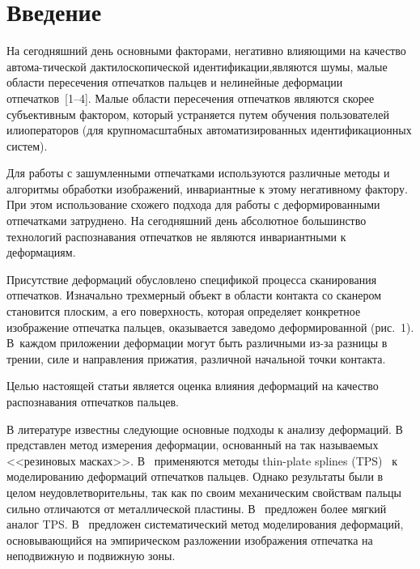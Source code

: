       \begin{multicols}{2}

      \label{st\stat}

     \section*{Введение}
      
      На сегодняшний день основными факторами, негативно влияющими на качество 
автома-\linebreak тической дактилоскопической идентификации,\linebreak являются шумы, малые области 
пересечения отпечатков пальцев и нелинейные деформации отпечатков~[1--4].  Малые 
области пересечения отпечатков являются скорее субъективным фактором, который 
устраняется путем обучения пользователей или\linebreak операторов (для крупномасштабных 
автоматизированных идентификационных систем).
      
      Для работы с зашумленными отпечатками используются различные методы и 
алгоритмы обработки изображений, инвариантные к этому негативному фактору. При 
этом использование схожего подхода для работы с деформированными отпечатками 
затруднено. На сегодняшний день абсолютное большинство технологий распознавания 
отпечатков не являются инвариантными к деформациям.
      
      Присутствие деформаций обусловлено спецификой процесса сканирования отпечатков. 
Изначально трехмерный объект в области контакта со сканером становится плоским, а его 
поверхность, которая определяет конкретное изображение отпечатка пальцев, оказывается 
заведомо деформированной (рис.~1). В~каж\-дом приложении деформации могут 
быть различными из-за разницы в трении, силе и направления прижатия, различной 
начальной точки контакта.

      Целью настоящей статьи является оценка влияния деформаций на качество 
распознавания отпечатков пальцев. 
     
      В литературе известны следующие основные подходы к анализу деформаций. 
В~\cite{5ushm} пред\-став\-лен метод измерения деформации, основанный на так 
называемых <<резиновых масках>>. В~\cite{6ushm} применяются методы thin-plate splines 
(TPS)~\cite{7ushm} к моделированию деформаций отпечатков пальцев. Однако 
результаты были в целом неудовлетворительны, так как по своим механическим 
свойствам пальцы сильно отличаются от металлической пластины. В~\cite{8ushm, 9ushm} 
предложен более мягкий аналог TPS. В~\cite{10ushm} предложен систематический метод 
моделирования деформаций, основывающийся на эмпирическом разложении изображения 
отпечатка на неподвижную и подвижную зоны. 


\end{multicols}

